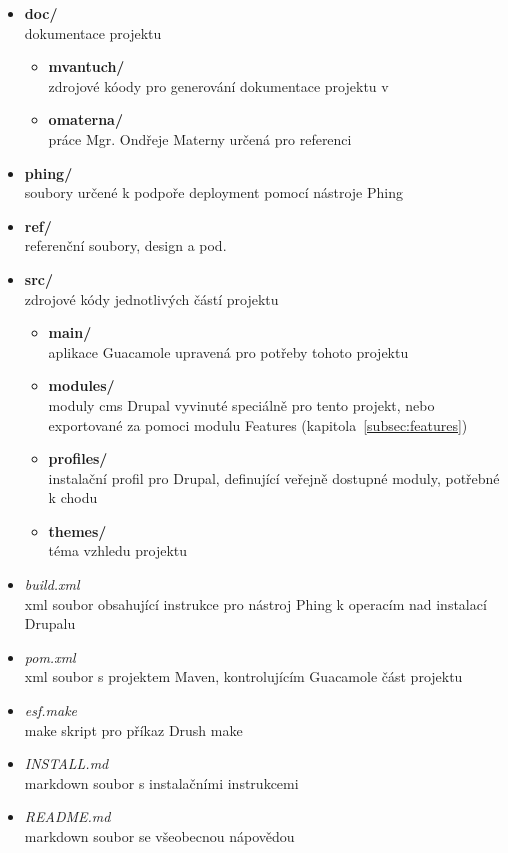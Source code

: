 \begin{itemize}
  \item \textbf{doc/} \hfill \\
    dokumentace projektu
  \begin{itemize}
    \item \textbf{mvantuch/} \hfill \\
      zdrojové kóody pro generování dokumentace projektu v 
    \item \textbf{omaterna/} \hfill \\
      práce Mgr. Ondřeje Materny určená pro referenci
  \end{itemize}
  \item \textbf{phing/} \hfill \\
    soubory určené k podpoře \gls{deployment} pomocí nástroje Phing
  \item \textbf{ref/} \hfill \\
    referenční soubory, design a pod.
  \item \textbf{src/} \hfill \\
    zdrojové kódy jednotlivých částí projektu
    \begin{itemize}
      \item \textbf{main/} \hfill \\
        aplikace Guacamole upravená pro potřeby tohoto projektu
      \item \textbf{modules/} \hfill \\
        moduly \gls{cms} Drupal vyvinuté speciálně pro tento projekt, nebo exportované za pomoci modulu Features (kapitola~\ref{subsec:features})
      \item \textbf{profiles/} \hfill \\
        instalační profil pro Drupal, definující veřejně dostupné moduly, potřebné k chodu
      \item \textbf{themes/} \hfill \\
       téma vzhledu projektu
    \end{itemize}
  \item \emph{build.xml} \hfill \\
    xml soubor obsahující instrukce pro nástroj Phing k operacím nad instalací Drupalu
  \item \emph{pom.xml} \hfill \\
    xml soubor s projektem Maven, kontrolujícím Guacamole část projektu
  \item \emph{esf.make} \hfill \\
    make skript pro příkaz Drush make
  \item \emph{INSTALL.md} \hfill \\
    markdown soubor s instalačními instrukcemi
  \item \emph{README.md} \hfill \\
    markdown soubor se všeobecnou nápovědou
\end{itemize}

